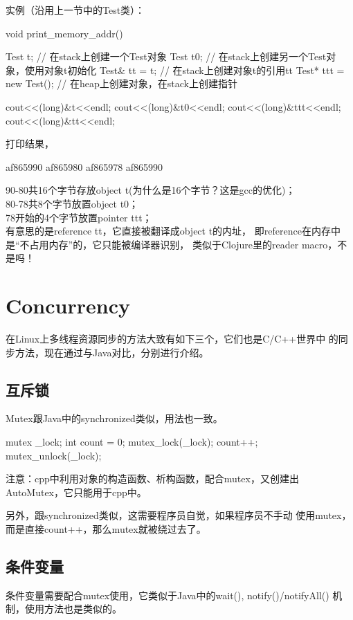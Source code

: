 \documentclass[a4paper,11pt]{article}
\begin{document}
实例（沿用上一节中的Test类）：

\begin{cppcode}
void print_memory_addr() {
    Test t;   // 在stack上创建一个Test对象
    Test t0;  // 在stack上创建另一个Test对象，使用对象t初始化
    Test& tt = t; // 在stack上创建对象t的引用tt
    Test* ttt = new Test(); // 在heap上创建对象，在stack上创建指针

    cout<<(long)&t<<endl;
    cout<<(long)&t0<<endl;
    cout<<(long)&ttt<<endl;
    cout<<(long)&tt<<endl;
}
\end{cppcode}

打印结果，

\begin{bashcode}
af865990
af865980
af865978
af865990
\end{bashcode}

90-80共16个字节存放object t(为什么是16个字节？这是gcc的优化)；\\
80-78共8个字节放置object t0；\\
78开始的4个字节放置pointer ttt；\\
有意思的是reference tt，它直接被翻译成object t的内址，
即reference在内存中是“不占用内存”的，它只能被编译器识别，
类似于Clojure里的reader macro，不是吗！

\section[Concurrency]{Concurrency}
在Linux上多线程资源同步的方法大致有如下三个，它们也是C/C++世界中
的同步方法，现在通过与Java对比，分别进行介绍。

\subsection[互斥锁]{互斥锁}
Mutex跟Java中的synchronized类似，用法也一致。

\begin{cppcode}
  mutex _lock;
  int count = 0;
  mutex_lock(_lock);
  count++;
  mutex_unlock(_lock);
\end{cppcode}

注意：cpp中利用对象的构造函数、析构函数，配合mutex，又创建出
AutoMutex，它只能用于cpp中。

另外，跟synchronized类似，这需要程序员自觉，如果程序员不手动
使用mutex，而是直接count++，那么mutex就被绕过去了。

\subsection[条件变量]{条件变量}
条件变量需要配合mutex使用，它类似于Java中的wait(), notify()/notifyAll()
机制，使用方法也是类似的。
\end{document}
